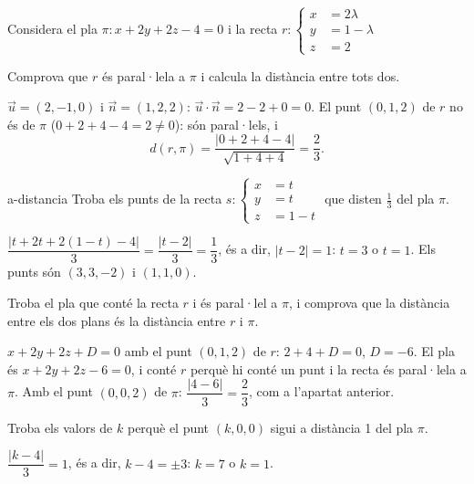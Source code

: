 Considera el pla $\pi\colon x+2y+2z-4=0$ i la recta
$r\colon\left\{\begin{aligned}x&=2\lambda\\y&=1-\lambda\\z&=2\end{aligned}\right.$

\begin{apartats}

Comprova que $r$ és paral·lela a $\pi$ i calcula la distància entre tots dos.

\begin{solucio}
$\vec u=(2,-1,0)$ i $\vec n=(1,2,2)$: $\vec u\cdot\vec n=2-2+0=0$. El punt $(0,1,2)$ de $r$ no és de
$\pi$ ($0+2+4-4=2\ne0$): són paral·lels, i
\[
d(r,\pi)=\frac{|0+2+4-4|}{\sqrt{1+4+4}}=\frac23.
\]
\end{solucio}

\begin{tria}{a-distancia}
Troba els punts de la recta $s\colon\left\{\begin{aligned}x&=t\\y&=t\\z&=1-t\end{aligned}\right.$ que
disten $\frac13$ del pla $\pi$.

\begin{solucio}
$\dfrac{|t+2t+2(1-t)-4|}{3}=\dfrac{|t-2|}{3}=\dfrac13$, és a dir, $|t-2|=1$: $t=3$ o $t=1$. Els punts són
$(3,3,-2)$ i $(1,1,0)$.
\end{solucio}

Troba el pla que conté la recta $r$ i és paral·lel a $\pi$, i comprova que la distància entre els dos
plans és la distància entre $r$ i $\pi$.

\begin{solucio}
$x+2y+2z+D=0$ amb el punt $(0,1,2)$ de $r$: $2+4+D=0$, $D=-6$. El pla és $x+2y+2z-6=0$, i conté $r$
perquè hi conté un punt i la recta és paral·lela a $\pi$. Amb el punt $(0,0,2)$ de $\pi$:
$\dfrac{|4-6|}{3}=\dfrac23$, com a l'apartat anterior.
\end{solucio}
\end{tria}

\begin{nomesllarg}
Troba els valors de $k$ perquè el punt $(k,0,0)$ sigui a distància 1 del pla $\pi$.

\begin{solucio}
$\dfrac{|k-4|}{3}=1$, és a dir, $k-4=\pm3$: $k=7$ o $k=1$.
\end{solucio}
\end{nomesllarg}

\end{apartats}
